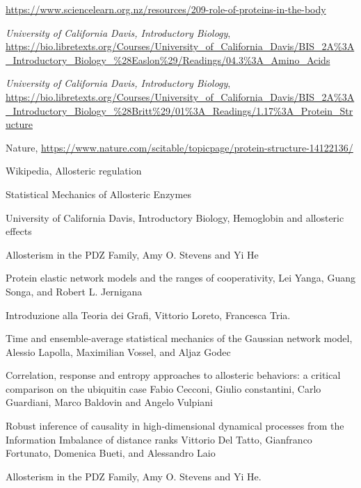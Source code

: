 \documentclass[English, Lau, oneside]{sapthesis}
\begin{document}
\newpage
\newpage
\begin{thebibliography}{100}

    \url{https://www.sciencelearn.org.nz/resources/209-role-of-proteins-in-the-body}
    
    \emph{University of California Davis, Introductory Biology}, 
    \url{https://bio.libretexts.org/Courses/University_of_California_Davis/BIS_2A%3A_Introductory_Biology_%28Easlon%29/Readings/04.3%3A_Amino_Acids}
    
    \emph{University of California Davis, Introductory Biology}, 
    \url{https://bio.libretexts.org/Courses/University_of_California_Davis/BIS_2A%3A_Introductory_Biology_%28Britt%29/01%3A_Readings/1.17%3A_Protein_Structure}
    
    Nature, \url{https://www.nature.com/scitable/topicpage/protein-structure-14122136/}
    
    Wikipedia, Allosteric regulation 
    
    Statistical Mechanics of Allosteric Enzymes
    
    University of California Davis, Introductory Biology, Hemoglobin and allosteric effects
    
    Allosterism in the PDZ Family, Amy O. Stevens and Yi He
    
    Protein elastic network models and the ranges of cooperativity, Lei Yanga, Guang Songa, and Robert L. Jernigana
    
    Introduzione alla Teoria dei Grafi, Vittorio Loreto, Francesca Tria.
    
    Time and ensemble-average statistical mechanics of the Gaussian network model, Alessio Lapolla, Maximilian Vossel, and Aljaz Godec
    
    Correlation, response and entropy approaches to allosteric behaviors: a critical comparison on the ubiquitin case Fabio Cecconi, Giulio constantini, Carlo Guardiani, Marco Baldovin and Angelo Vulpiani
    
    Robust inference of causality in high-dimensional dynamical processes from the Information Imbalance of distance ranks
    Vittorio Del Tatto, Gianfranco Fortunato, Domenica Bueti, and Alessandro Laio
    
    Allosterism in the PDZ Family, Amy O. Stevens and Yi He.

    
\end{thebibliography}
\end{document}
